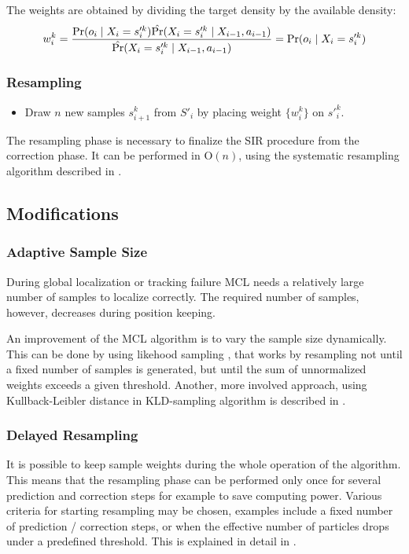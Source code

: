 The weights are obtained by dividing the target density by the available density:
\begin{equation}
	w^k_i = 
	\frac{
		\operatorname{\mathrm{Pr}}(o_i \mid X_i = s'^k_i) \hat{\operatorname{\mathrm{Pr}}}(X_i = s'^k_i \mid X_{i - 1}, a_{i - 1})
	}{
		\hat{\operatorname{\mathrm{Pr}}}(X_i =  s'^k_i \mid X_{i - 1}, a_{i - 1})
	} = \operatorname{\mathrm{Pr}}(o_i \mid X_i = s'^k_i)
\end{equation}

\subsubsection{Resampling}
\begin{itemize}
\item
Draw \(n\) new samples \(s^k_{i+1}\) from \(S'_i\) by placing
weight \(\{w^k_i\}\) on \(s'^k_{i}\).
\end{itemize}

The resampling phase is necessary to finalize the SIR procedure from the correction phase.
It can be performed in \(\mathrm{O}(n)\), using the systematic
resampling algorithm described in \cite{arulampalam01}.

\subsection{Modifications}

\subsubsection{Adaptive Sample Size}
During global localization or tracking failure MCL needs a relatively large number
of samples to localize correctly.
The required number of samples, however, decreases during position keeping.

An improvement of the MCL algorithm is to vary the sample size dynamically.
This can be done by using likehood sampling \cite{fox99}, that works by
resampling not until a fixed number of samples is
generated, but until the sum of unnormalized weights exceeds a given threshold.
Another, more involved approach, using Kullback-Leibler distance in KLD-sampling algorithm
is described in \cite{fox03}.

\subsubsection{Delayed Resampling}
It is possible to keep sample weights during the whole operation of the algorithm.
This means that the resampling phase can be performed only once for several prediction and correction steps
for example to save computing power.
Various criteria for starting resampling may be chosen, examples include a fixed number of
prediction / correction steps, or when the effective number of particles drops under a predefined threshold.
This is explained in detail in \cite{arulampalam01}.

